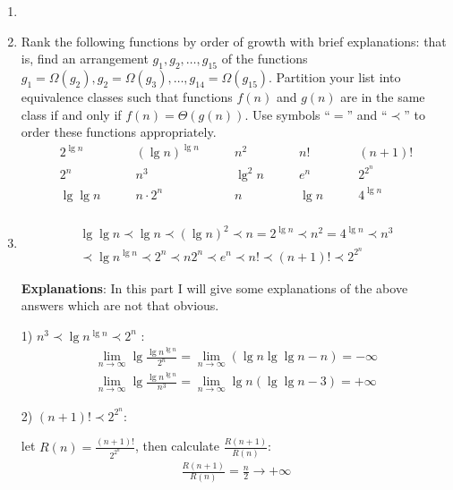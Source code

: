 \documentclass[12pt,a4paper]{article}
\makeatletter
\newtheorem*{solution}{Solution}
\theoremstyle{definition}
\renewenvironment{solution}[1][Solution] {\par\pushQED{\qed}\normalfont\topsep6\p@\@plus6\p@\relax\trivlist\item[\hskip\labelsep\bfseries#1\@addpunct{.}]\ignorespaces}{\popQED\endtrivlist\@endpefalse} \makeatother
\makeatother
\begin{document}
\begin{enumerate}
\begin{solution}
 

       

    \end{solution}

    \item

    Rank the following functions by order of growth with brief explanations: that is, find an arrangement $g_1, g_2, \ldots , g_{15}$ of the functions $g_1 = \Omega(g_2), g_2 = \Omega(g_3), \ldots, g_{14} = \Omega(g_{15})$.  Partition your list into equivalence classes such that functions $f(n)$ and $g(n)$ are in the same class if and only if $f(n) = \Theta(g(n))$. Use symbols ``$=$'' and ``$\prec$'' to order these functions appropriately.
    $$
    \begin{array}{ccccc}
        2^{\lg n} \quad & \quad (\lg n)^{\lg n} \quad & \quad n^2 \quad & \quad n! \quad & \quad (n + 1)! \\
        2^n \quad & \quad n^3 \quad & \quad \lg^2 n \quad & \quad e^n \quad & \quad 2^{2^n} \\
        \lg\lg n \quad & \quad n\cdot 2^n \quad & \quad n \quad & \quad \lg n \quad & \quad 4^{\lg n} \\
    \end{array}
    $$


    \begin{solution}
        \begin{align*}
           \lg\lg{n} \prec \lg n \prec (\lg n)^2 \prec n = 2^{\lg n} \prec n^2 = 4^{\lg n} \prec n^3 \\
            \prec \lg n^{\lg n} \prec 2^n \prec n2^n \prec e^n  \prec n! \prec (n + 1)! \prec 2^{2^n}
        \end{align*}

    \textbf{Explanations}: In this part I will give some explanations of the above answers which are not that obvious.
    
    1) \textbf{$n^3 \prec \lg{n} ^ {\lg{n}} \prec 2 ^n$} :
    \begin{align*}
        \lim_{n \to \infty}\lg \frac{\lg n^{\lg n}}{2^n} =  \lim_{n \to \infty}(\lg n \lg\lg n- n) = -\infty\\
        \lim_{n \to \infty}\lg \frac{\lg n^{\lg n}}{n^3} =  \lim_{n \to \infty}\lg n(\lg\lg n - 3) = +\infty  
    \end{align*}

    2) \textbf{$(n + 1)! \prec 2^{2^n}$}:
        
      \qquad let $R(n) = \frac{(n + 1)!}{2^{2^n}}$, then calculate $\frac{R(n + 1)}{R(n)}$:
       \begin{align*}
        \frac{R(n + 1)}{R(n)} = \frac{n}{2} \to +\infty
    \end{align*}


\end{solution}
\end{enumerate}
\end{document}
